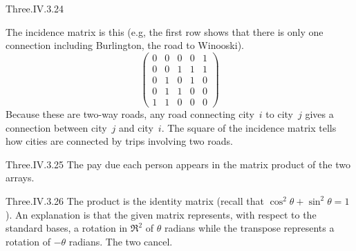 \begin{ans}{Three.IV.3.24}
      \begin{exparts}
        \partsitem The incidence matrix is this
          (e.g, the first row shows that there is only one connection
          including Burlington, the road to Winooski).
          \begin{equation*}
            \begin{pmatrix}
              0  &0  &0  &0  &1  \\
              0  &0  &1  &1  &1  \\
              0  &1  &0  &1  &0  \\
              0  &1  &1  &0  &0  \\
              1  &1  &0  &0  &0
            \end{pmatrix}
          \end{equation*}
        \partsitem Because these are two-way roads,
          any road connecting city~\( i \)
          to city~\( j \) gives a connection between city~\( j \) and
          city~\( i \).
        \partsitem The square of the incidence matrix tells how cities
          are connected
          by trips involving two roads.
      \end{exparts}
   
\end{ans}
\begin{ans}{Three.IV.3.25}
      The pay due each person appears in the matrix product of the two
      arrays.
    
\end{ans}
\begin{ans}{Three.IV.3.26}
      The product is the identity matrix (recall that
      $\cos^2\theta+\sin^2\theta =1$).
      An explanation is that the given matrix represents, with respect to
      the standard bases, a rotation in \( \Re^2 \) of \( \theta \)
      radians while the transpose represents a rotation of \( -\theta \)
      radians.
      The two cancel.
     
\end{ans}
